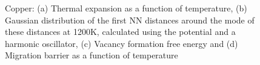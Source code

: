 \documentclass{article}
\begin{document}
\begin{figure}[!htp]
\centering
{}
\hfill
{}
\hfill
\caption{Copper: (a) Thermal expansion as a function of temperature, (b) Gaussian distribution of the first NN distances around the mode of these distances at 1200K, calculated using the potential \cite{Mendelev2008} and a harmonic oscillator, (c) Vacancy formation free energy and (d) Migration barrier as a function of temperature}
\label{fig:13}
\end{figure}
\end{document}
